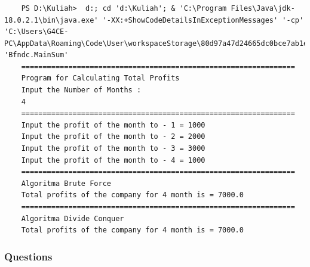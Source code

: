 \documentclass[12pt,titlepage]{article}
\begin{document}
\subsubsection{}

\begin{verbatim}
    PS D:\Kuliah>  d:; cd 'd:\Kuliah'; & 'C:\Program Files\Java\jdk-18.0.2.1\bin\java.exe' '-XX:+ShowCodeDetailsInExceptionMessages' '-cp' 'C:\Users\G4CE-PC\AppData\Roaming\Code\User\workspaceStorage\80d97a47d24665dc0bce7ab1e048ecbd\redhat.java\jdt_ws\Kuliah_28156aa7\bin' 'Bfndc.MainSum' 
    ================================================================
    Program for Calculating Total Profits
    Input the Number of Months :
    4
    ================================================================
    Input the profit of the month to - 1 = 1000
    Input the profit of the month to - 2 = 2000
    Input the profit of the month to - 3 = 3000
    Input the profit of the month to - 4 = 1000
    ================================================================
    Algoritma Brute Force
    Total profits of the company for 4 month is = 7000.0
    ================================================================
    Algoritma Divide Conquer
    Total profits of the company for 4 month is = 7000.0
\end{verbatim}

\subsubsection{Questions}
\end{document}

